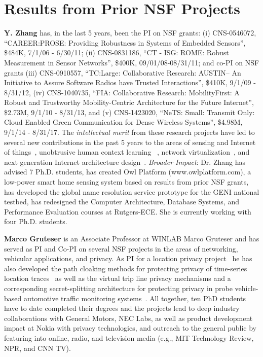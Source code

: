 \section{Results from Prior NSF Projects}\label{sec:prior}\vspace{-8pt}

\noindent \textbf{Y. Zhang} has, in the last 5 years, been the PI on NSF grants:
(i) CNS-0546072,  ``CAREER:PROSE: Providing Robustness in Systems of Embedded Sensors'', \$484K,  7/1/06 - 6/30/11;
(ii) CNS-0831186, ``CT - ISG: ROME: Robust Measurement in Sensor Networks'', \$400K, 09/01/08-08/31/11;
and co-PI on NSF grants
(iii) CNS-0910557, ``TC:Large: Collaborative Research: AUSTIN-- An Initiative to Assure Software Radios have Trusted Interactions'', \$410K, 9/1/09 - 8/31/12, (iv) CNS-1040735, ``FIA: Collaborative Research: MobilityFirst: A Robust and Trustworthy Mobility-Centric Architecture for the Future Internet'', \$2.73M, 9/1/10 - 8/31/13, and (v) CNS-1423020, ``NeTS: Small: Transmit Only: Cloud Enabled Green Communication for
Dense Wireless Systems'', \$4.98M, 9/1/14 - 8/31/17.
The \emph{intellectual merit} from these research projects have led to several new contributions in the past 5 years to the areas of sensing and Internet of things~\cite{zan-etal:mdm10,sun2012association,sun2011improved,sun2012boomerang,moore2013building}, unobtrusive human context learning ~\cite{xu2012improving,xu2012towards,xu2013crowd++,xu2013scpl}, network virtualization~\cite{bhanage2011virtual,bhanage2011experimental}, and next generation Internet architecture design~\cite{vu2012dmap,sun2011improving,zhang2012content,liu2013secure,zhang2013using,li2013mobile,li2012popularity}. \emph{Broader Impact}: Dr. Zhang has advised 7 Ph.D. students,  has created Owl Platform (www.owlplatform.com), a low-power smart home sensing system based on results from prior NSF grants, has developed the global name resolution service prototype for the GENI national testbed, has redesigned the Computer Architecture, Database Systems, and Performance Evaluation courses at Rutgers-ECE. She is currently working with four Ph.D. students.

\textbf{Marco Gruteser} is an Associate Professor at WINLAB Marco Gruteser and has served as PI and Co-PI on several NSF projects in the areas of networking, vehicular applications, and privacy. As PI for a location privacy
project~\cite{nsf-ct-anonymity} he has also developed the path cloaking methods for
protecting privacy of time-series location traces~\cite{1315266_hoh_privacy_gps,
hoh06:_enhan_privac_preser_anony_locat} as well as the virtual trip line privacy
mechanisms and a corresponding secret-splitting architecture for protecting
privacy in probe vehicle-based automotive traffic monitoring
systems~\cite{hoh_virtual_trip_lines,1717364_hoh_privacy_traffic_monitoring}.
All together, ten PhD students have to date completed their degrees and the projects lead to deep industry collaborations with General Motors, NEC Labs, as well as product
development impact at Nokia with privacy technologies, and outreach to the general public by featuring into online, radio, and television media (e.g., MIT Technology Review, NPR, and CNN TV).
